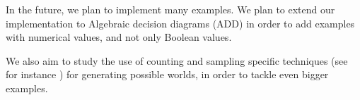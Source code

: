 In the future, we plan to implement many examples. We plan to extend our implementation to Algebraic decision diagrams (ADD) \cite{DBLP:journals/fmsd/BaharFGHMPS97} in order to add examples with numerical values, and not only Boolean values.

We also aim to study the use of counting and sampling specific techniques (see for instance \citet{DBLP:conf/aaai/MeelVCFSFIM16}) for generating possible worlds, in order to tackle even bigger examples.

